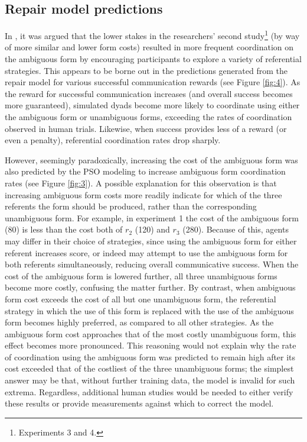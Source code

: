 \documentclass[11pt]{article}
\begin{document}
\subsection{Repair model predictions}
In \citeauthor{rohde2012}, it was argued that the lower stakes in the researchers' second study\footnote{Experiments 3 and 4.} (by way of more similar and lower form costs) resulted in more frequent coordination on the ambiguous form by encouraging participants to explore a variety of referential strategies. This appears to be borne out in the predictions generated from the repair model for various successful communication rewards (see Figure \ref{fig:4}). As the reward for successful communication increases (and overall success becomes more guaranteed), simulated dyads become more likely to coordinate using either the ambiguous form or unambiguous forms, exceeding the rates of coordination observed in human trials. Likewise, when success provides less of a reward (or even a penalty), referential coordination rates drop sharply. 

However, seemingly paradoxically, increasing the cost of the ambiguous form was also predicted by the PSO modeling to increase ambiguous form coordination rates (see Figure \ref{fig:3}). A possible explanation for this observation is that increasing ambiguous form costs more readily indicate for which of the three referents the form should be produced, rather than the corresponding unambiguous form. For example, in experiment 1 the cost of the ambiguous form (80) is less than the cost both of $r_2$ (120) and $r_3$ (280). Because of this, agents may differ in their choice of strategies, since using the ambiguous form for either referent increases score, or indeed may attempt to use the ambiguous form for both referents simultaneously, reducing overall communicative success. When the cost of the ambiguous form is lowered further, all three unambiguous forms become more costly, confusing the matter further. By contrast, when ambiguous form cost exceeds the cost of all but one unambiguous form, the referential strategy in which the use of this form is replaced with the use of the ambiguous form becomes highly preferred, as compared to all other strategies. As the ambiguous form cost approaches that of the most costly unambiguous form, this effect becomes more pronounced. This reasoning would not explain why the rate of coordination using the ambiguous form was predicted to remain high after its cost exceeded that of the costliest of the three unambiguous forms; the simplest answer may be that, without further training data, the model is invalid for such extrema. Regardless, additional human studies would be needed to either verify these results or provide measurements against which to correct the model.
\end{document}
